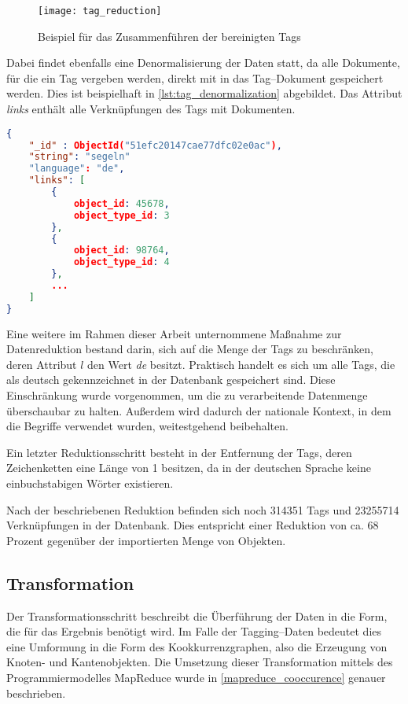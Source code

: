 \begin{figure}
\centering
\texttt{[image: tag\_reduction]}
\caption{Beispiel für das Zusammenführen der bereinigten Tags}
\label{fig:tag_reduction}
\end{figure}

Dabei findet ebenfalls eine Denormalisierung der Daten statt, da alle Dokumente, für die ein Tag vergeben werden, direkt mit in das Tag--Dokument gespeichert werden. Dies ist beispielhaft in \cref{lst:tag_denormalization} abgebildet. Das Attribut \emph{links} enthält alle Verknüpfungen des Tags mit Dokumenten.

\begin{lstlisting}[language=json, label={lst:tag_denormalization}, caption={Denormalisierte Tag-Daten}]
{
    "_id" : ObjectId("51efc20147cae77dfc02e0ac"),
    "string": "segeln"
    "language": "de",
    "links": [
        {
            object_id: 45678, 
            object_type_id: 3
        },
        {
            object_id: 98764, 
            object_type_id: 4
        },
        ...
    ]
}
\end{lstlisting}

Eine weitere im Rahmen dieser Arbeit unternommene Maßnahme zur Datenreduktion bestand darin, sich auf die Menge der Tags zu beschränken, deren Attribut \(l\) den Wert \emph{de} besitzt. Praktisch handelt es sich um alle Tags, die als deutsch gekennzeichnet in der Datenbank gespeichert sind. Diese Einschränkung wurde vorgenommen, um die zu verarbeitende Datenmenge überschaubar zu halten. Außerdem wird dadurch der nationale Kontext, in dem die Begriffe verwendet wurden, weitestgehend beibehalten.

Ein letzter Reduktionsschritt besteht in der Entfernung der Tags, deren Zeichenketten eine Länge von \num{1} besitzen, da in der deutschen Sprache keine einbuchstabigen Wörter existieren.

Nach der beschriebenen Reduktion befinden sich noch \num{314351} Tags und \num{23255714} Verknüpfungen in der Datenbank. Dies entspricht einer Reduktion von ca. \num{68} Prozent gegenüber der importierten Menge von Objekten.

\subsection{Transformation}

Der Transformationsschritt beschreibt die Überführung der Daten in die Form, die für das Ergebnis benötigt wird. Im Falle der Tagging--Daten bedeutet dies eine Umformung in die Form des Kookkurrenzgraphen, also die Erzeugung von Knoten- und Kantenobjekten. Die Umsetzung dieser Transformation mittels des Programmiermodelles MapReduce wurde in \cref{mapreduce_cooccurence} genauer beschrieben.

